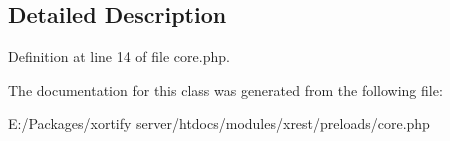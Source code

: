 \subsection{Detailed Description}


Definition at line 14 of file core.\-php.



The documentation for this class was generated from the following file\-:\begin{DoxyCompactItemize}
\item 
E\-:/\-Packages/xortify server/htdocs/modules/xrest/preloads/core.\-php\end{DoxyCompactItemize}

